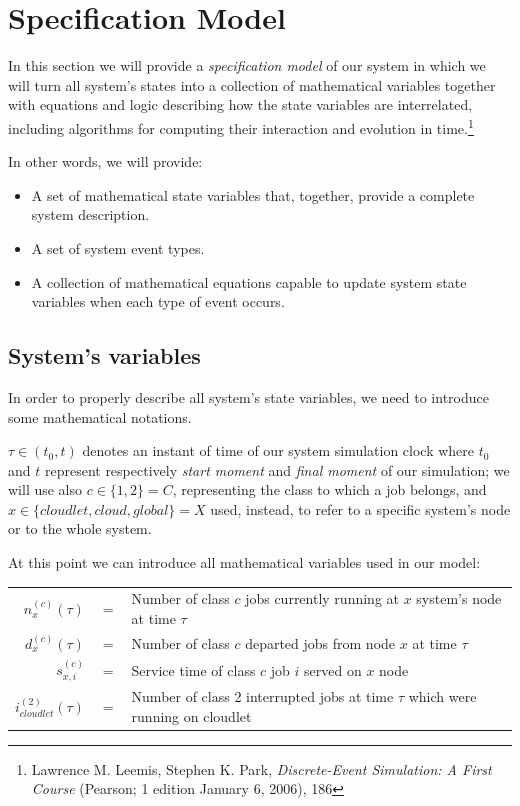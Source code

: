 \documentclass[10pt,a4paper]{article}
\begin{document}
\clearpage
\newpage
\section{Specification Model}\label{Specification}

In this section we will provide a \textit{specification model} of our system in which we will turn all system's states into a collection of mathematical variables together with equations and logic describing how the state variables are interrelated, including algorithms for computing their interaction and evolution in time.\footnote{Lawrence M. Leemis, Stephen K. Park, \textit{Discrete-Event Simulation: A First Course} (Pearson; 1 edition January 6, 2006), 186}

In other words, we will provide:

\begin{itemize}
\item A set of mathematical state variables that, together, provide a complete system description.
\item A set of system event types.
\item A collection of mathematical equations capable to update system state variables when each type of event occurs.
\end{itemize}

\subsection{System's variables}

In order to properly describe all system's state variables, we need to introduce some mathematical notations.

$\tau \in (t_0, t)$ denotes an instant of time of our system simulation clock where $t_0$ and $t$ represent respectively \textit{start moment} and \textit{final moment} of our simulation; we will use also $c \in \lbrace 1,2 \rbrace = C$, representing the class to which a job belongs, and $x \in \lbrace cloudlet,cloud,global \rbrace = X$ used, instead, to refer to a specific system's node or to the whole system.

At this point we can introduce all mathematical variables used in our model:

\begin{table}[h!]
    \centering
    \small
    \begin{tabular}{rcl}
       
      $n_x^{(c)}(\tau)$ & $ = $ & Number of class $c$ jobs currently running at $x$ system's node at time $\tau$ \\
      $d_x^{(c)}(\tau)$ & $ = $ & Number of class $c$ departed jobs from node $x$ at time $\tau$ \\
      $s_{x,i}^{(c)}$ & $ = $ & Service time of class $c$ job $i$ served on $x$ node   \\
      $i_{cloudlet}^{(2)}(\tau)$ & $ = $ & Number of class 2 interrupted jobs at time $\tau$ which were running on cloudlet\\
          
    \end{tabular}
\end{table}
\end{document}
